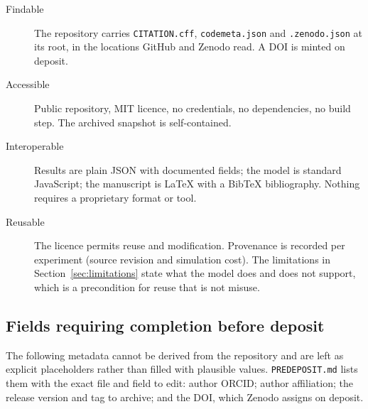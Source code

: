 \begin{description}
\item[Findable] The repository carries \texttt{CITATION.cff},
  \texttt{codemeta.json} and \texttt{.zenodo.json} at its root, in the
  locations GitHub and Zenodo read. A DOI is minted on deposit.
\item[Accessible] Public repository, MIT licence, no credentials, no
  dependencies, no build step. The archived snapshot is self-contained.
\item[Interoperable] Results are plain JSON with documented fields; the model
  is standard JavaScript; the manuscript is \LaTeX{} with a BibTeX
  bibliography. Nothing requires a proprietary format or tool.
\item[Reusable] The licence permits reuse and modification. Provenance is
  recorded per experiment (source revision and simulation cost). The
  limitations in Section~\ref{sec:limitations} state what the model does and
  does not support, which is a precondition for reuse that is not misuse.
\end{description}

\subsection{Fields requiring completion before deposit}

The following metadata cannot be derived from the repository and are left as
explicit placeholders rather than filled with plausible values.
\texttt{PREDEPOSIT.md} lists them with the exact file and field to edit:
author ORCID; author affiliation; the release version and tag to archive; and
the DOI, which Zenodo assigns on deposit.
